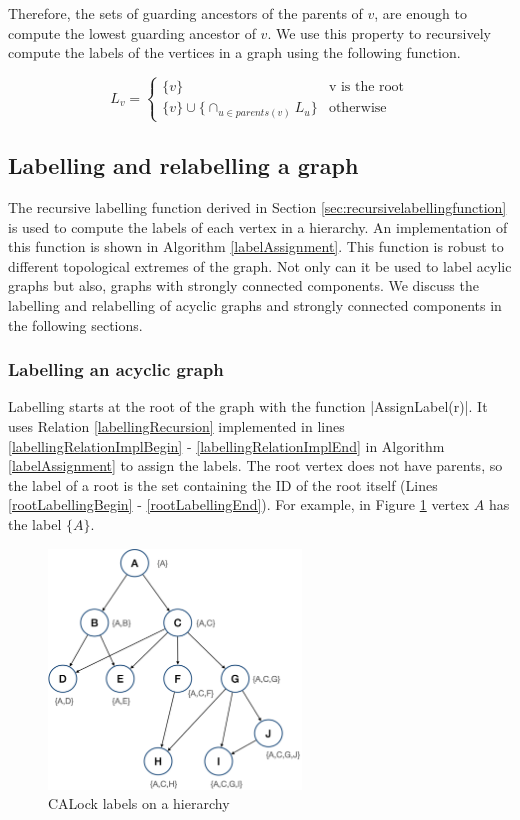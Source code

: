 Therefore, the sets of guarding ancestors of the parents of $v$, are enough to compute the lowest guarding ancestor of $v$. 
We use this property to recursively compute the labels of the vertices in a graph using the following function.

\begin{equation}\label{labellingRecursion}
	L_v = 
	\begin{cases}
		\{v\} & \text{v is the root} \\
		\{v\} \cup \{ \cap_{u\in parents(v)} L_u\} & \text{otherwise}
	\end{cases}
\end{equation}


\subsection{Labelling and relabelling a graph}
The recursive labelling function derived in Section \ref{sec:recursivelabellingfunction} is used to compute the labels of each vertex in a hierarchy. An implementation of this function is shown in Algorithm \ref{labelAssignment}. This function is robust to different topological extremes of the graph. Not only can it be used to label acylic graphs but also, graphs with strongly connected components. We discuss the labelling and relabelling of acyclic graphs and strongly connected components in the following sections. 

\subsubsection{Labelling an acyclic graph}
Labelling starts at the root of the graph with the function \inline|AssignLabel(r)|. It uses Relation \ref{labellingRecursion} implemented in lines \ref{labellingRelationImplBegin} - \ref{labellingRelationImplEnd} in Algorithm \ref{labelAssignment} to assign the labels. The root vertex does not have parents, so the label of a root is the set containing the ID of the root itself (Lines \ref{rootLabellingBegin} - \ref{rootLabellingEnd}). For example, in Figure \ref{fig:calockexample} vertex $A$ has the label $\{A\}$.

\begin{figure}[h]
	\centering
	\captionsetup{justification=centering}
	\includegraphics[width=0.6\textwidth]{figures/CALockExample.png}
	\caption{CALock labels on a hierarchy}
	\label{fig:calockexample}
\end{figure}

